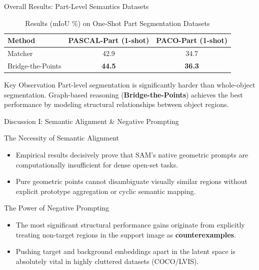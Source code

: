 \documentclass[aspectratio=169, 10pt]{beamer}
\begin{document}
\begin{frame}{Overall Results: Part-Level Semantics Datasets}
\vspace{-0.2cm}

\begin{table}[htbp]
\centering
\caption{Results (mIoU \%) on One-Shot Part Segmentation Datasets}
\renewcommand{\arraystretch}{1.2}
\small
\begin{tabular}{l c c}
\toprule
\textbf{Method} & \textbf{PASCAL-Part (1-shot)} & \textbf{PACO-Part (1-shot)} \\
\midrule
Matcher \cite{liu2023matcher} & 42.9 & 34.7 \\
Bridge-the-Points \cite{zhang2024bridge} & \textbf{44.5} & \textbf{36.3} \\
\bottomrule
\end{tabular}
\end{table}

\vspace{0.3cm}

\begin{alertblock}{Key Observation}
Part-level segmentation is significantly harder than whole-object segmentation.  
Graph-based reasoning (\textbf{Bridge-the-Points}) achieves the best performance by modeling structural relationships between object regions.
\end{alertblock}

\end{frame}

\begin{frame}{Discussion I: Semantic Alignment \& Negative Prompting}
    \begin{alertblock}{The Necessity of Semantic Alignment}
        \begin{itemize}
            \item Empirical results decisively prove that SAM's native geometric prompts are computationally insufficient for dense open-set tasks.
            \item Pure geometric points cannot disambiguate visually similar regions without explicit prototype aggregation or cyclic semantic mapping.
        \end{itemize}
    \end{alertblock}

    \begin{exampleblock}{The Power of Negative Prompting}
        \begin{itemize}
            \item The most significant structural performance gains originate from explicitly treating non-target regions in the support image as \textbf{counterexamples}.
            \item Pushing target and background embeddings apart in the latent space is absolutely vital in highly cluttered datasets (COCO/LVIS).
        \end{itemize}
    \end{exampleblock}
\end{frame}
\end{document}
